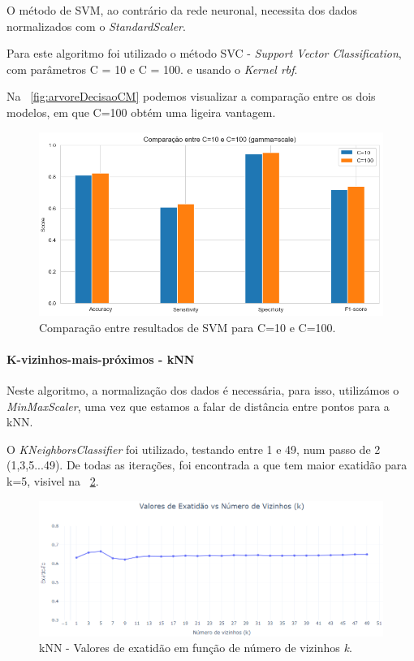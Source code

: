 \documentclass[conference]{IEEEtran}
\begin{document}
O método de SVM, ao contrário da rede neuronal, necessita dos dados normalizados com o \textit{StandardScaler}. 

Para este algoritmo foi utilizado o método SVC - \textit{Support Vector Classification}, com parâmetros C = 10 e C = 100. e usando o \textit{Kernel rbf}.

Na \figurename~\ref{fig:arvoreDecisaoCM} podemos visualizar a comparação entre os dois modelos, em que C=100 obtém uma ligeira vantagem.

\begin{figure}[h]
	\centering
	\includegraphics[width=0.7\linewidth]{svm_compare}
	\caption{Comparação entre resultados de SVM para C=10 e C=100.}
	\label{fig:svm_compare}
\end{figure}


\medskip

\paragraph{K-vizinhos-mais-próximos - kNN}

Neste algoritmo, a normalização dos dados é necessária, para isso, utilizámos o \textit{MinMaxScaler}, uma vez que estamos a falar de distância entre pontos para a kNN.

O \textit{KNeighborsClassifier} foi utilizado, testando entre 1 e 49, num passo de 2 (1,3,5...49). De todas as iterações, foi encontrada a que tem maior exatidão para k=5, visivel na \figurename~\ref{fig:kNN_exatidao_vs_k}.


\begin{figure}[h]
	\centering
	\includegraphics[width=0.9\linewidth]{kNN_exatidao_vs_k}
	\caption{kNN - Valores de exatidão em função de número de vizinhos \textit{k}.}
	\label{fig:kNN_exatidao_vs_k}
\end{figure}
\end{document}
